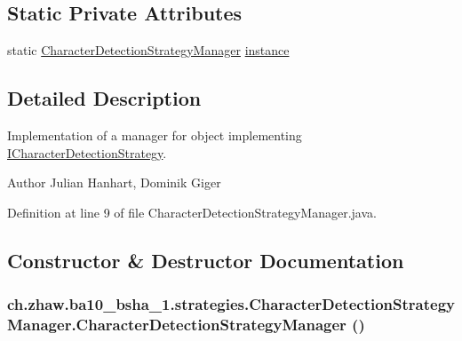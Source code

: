 \subsection*{Static Private Attributes}
\begin{DoxyCompactItemize}
\item 
static \hyperlink{classch_1_1zhaw_1_1ba10__bsha__1_1_1strategies_1_1CharacterDetectionStrategyManager}{CharacterDetectionStrategyManager} \hyperlink{classch_1_1zhaw_1_1ba10__bsha__1_1_1strategies_1_1CharacterDetectionStrategyManager_a181b41a12f8712fa1eebcaaa4879c26d}{instance}
\end{DoxyCompactItemize}


\subsection{Detailed Description}
Implementation of a manager for object implementing \hyperlink{interfacech_1_1zhaw_1_1ba10__bsha__1_1_1strategies_1_1ICharacterDetectionStrategy}{ICharacterDetectionStrategy}.

\begin{DoxyAuthor}{Author}
Julian Hanhart, Dominik Giger 
\end{DoxyAuthor}


Definition at line 9 of file CharacterDetectionStrategyManager.java.

\subsection{Constructor \& Destructor Documentation}
\hypertarget{classch_1_1zhaw_1_1ba10__bsha__1_1_1strategies_1_1CharacterDetectionStrategyManager_a3a9f72e8aa13f48ec368c05569be8d69}{
\subsubsection[{CharacterDetectionStrategyManager}]{\setlength{\rightskip}{0pt plus 5cm}ch.zhaw.ba10\_\-bsha\_\-1.strategies.CharacterDetectionStrategyManager.CharacterDetectionStrategyManager ()}}
\label{classch_1_1zhaw_1_1ba10__bsha__1_1_1strategies_1_1CharacterDetectionStrategyManager_a3a9f72e8aa13f48ec368c05569be8d69}


